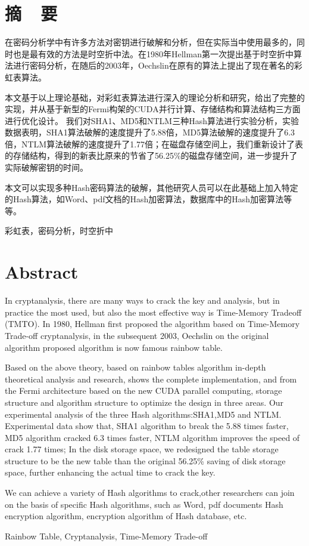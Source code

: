 \chapter* {摘~~要}
在密码分析学中有许多方法对密钥进行破解和分析，但在实际当中使用最多的，同时也是最有效的方法是时空折中法。在1980年Hellman第一次提出基于时空折中算法进行密码分析，在随后的2003年，Oechslin在原有的算法上提出了现在著名的彩虹表算法。

本文基于以上理论基础，对彩虹表算法进行深入的理论分析和研究，给出了完整的实现，并从基于新型的Fermi构架的CUDA并行计算、存储结构和算法结构三方面进行优化设计。
我们对SHA1、MD5和NTLM三种Hash算法进行实验分析，实验数据表明，SHA1算法破解的速度提升了5.88倍，MD5算法破解的速度提升了6.3倍，NTLM算法破解的速度提升了1.77倍；在磁盘存储空间上，我们重新设计了表的存储结构，得到的新表比原来的节省了56.25\%的磁盘存储空间，进一步提升了实际破解密钥的时间。

本文可以实现多种Hash密码算法的破解，其他研究人员可以在此基础上加入特定的Hash算法，如Word、pdf文档的Hash加密算法，数据库中的Hash加密算法等等。

\vskip 5cm
彩虹表，密码分析，时空折中\\
\setcounter{page}{3}

\chapter* {Abstract}
In cryptanalysis, there are many ways to crack the key and analysis, but in practice the most used, but also the most effective way is Time-Memory Tradeoff (TMTO).
In 1980, Hellman first proposed the algorithm based on Time-Memory Trade-off cryptanalysis, in the subsequent 2003, Oechslin on the original algorithm proposed algorithm is now famous rainbow table.

Based on the above theory, based on rainbow tables algorithm in-depth theoretical analysis and research, shows the complete implementation, and from the Fermi architecture based on the new CUDA parallel computing, storage structure and algorithm structure to optimize the design in three areas.
Our experimental analysis of the three Hash algorithms:SHA1,MD5 and NTLM.
Experimental data show that, SHA1 algorithm to break the 5.88 times faster, MD5 algorithm cracked 6.3 times faster, NTLM algorithm improves the speed of crack 1.77 times;
In the disk storage space, we redesigned the table storage structure to be the new table than the original 56.25\% saving of disk storage space, further enhancing the actual time to crack the key.

We can achieve a variety of Hash algorithms to crack,other researchers can join on the basis of specific Hash algorithms, such as Word, pdf documents Hash encryption algorithm, encryption algorithm of Hash database, etc.

\vskip 5cm
Rainbow Table, Cryptanalysis, Time-Memory Trade-off\\
\setcounter{page}{5}



